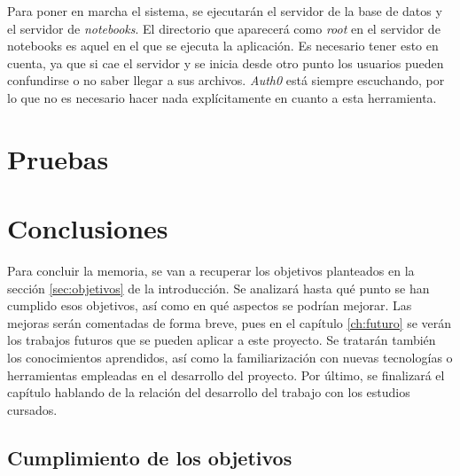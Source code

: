 \documentclass[11pt,spanish,listoffigures,listoftables]{tfgetsinf}
\begin{document}
Para poner en marcha el sistema, se ejecutarán el servidor de la base de datos y el servidor de \textit{notebooks}. El directorio que aparecerá como \textit{root} en el servidor de notebooks es aquel en el que se ejecuta la aplicación. Es necesario tener esto en cuenta, ya que si cae el servidor y se inicia desde otro punto los usuarios pueden confundirse o no saber llegar a sus archivos. \textit{Auth0} está siempre escuchando, por lo que no es necesario hacer nada explícitamente en cuanto a esta herramienta. 


\chapter{Pruebas}
\label{ch:pruebas}




\chapter{Conclusiones}
\label{ch:conclusiones}

Para concluir la memoria, se van a recuperar los objetivos planteados en la sección \ref{sec:objetivos} de la introducción. Se analizará hasta qué punto se han cumplido esos objetivos, así como en qué aspectos se podrían mejorar. Las mejoras serán comentadas de forma breve, pues en el capítulo \ref{ch:futuro} se verán los trabajos futuros que se pueden aplicar a este proyecto. Se tratarán también los conocimientos aprendidos, así como la familiarización con nuevas tecnologías o herramientas empleadas en el desarrollo del proyecto. Por último, se finalizará el capítulo hablando de la relación del desarrollo del trabajo con los estudios cursados.



\section{Cumplimiento de los objetivos}
\label{sec:conc-objetivos}
\end{document}
